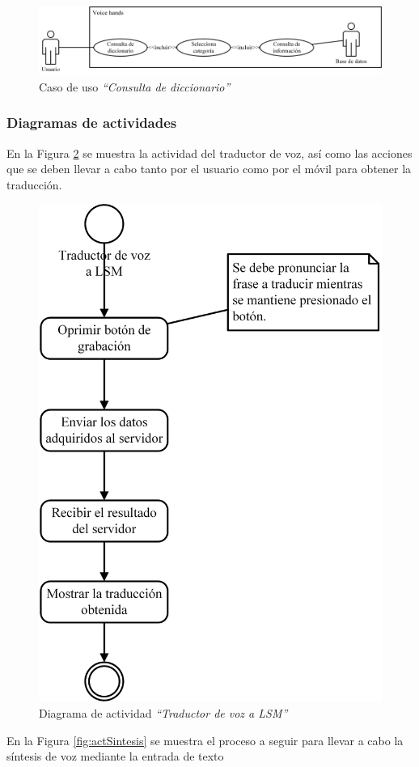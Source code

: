 		\begin{figure}[H]
			\centering
			\includegraphics[width=0.8\linewidth]{figures/casoUsoDicc}
			\caption{Caso de uso \textit{``Consulta de diccionario''}}
			\label{fig:casoUsoDicc}
		\end{figure}
		
\subsubsection{Diagramas de actividades}

En la Figura \ref{fig:actVoz} se muestra la actividad del traductor de voz, así como las acciones que se deben llevar a cabo tanto por el usuario como por el móvil para obtener la traducción.


		\begin{figure}[H]
			\centering
			\includegraphics[width=0.5\linewidth]{figures/actVoz}
			\caption{Diagrama de actividad \textit{``Traductor de voz a LSM''}}
			\label{fig:actVoz}
		\end{figure}
		
En la Figura \ref{fig:actSintesis} se muestra el proceso a seguir para llevar a cabo la síntesis de voz mediante la entrada de texto


